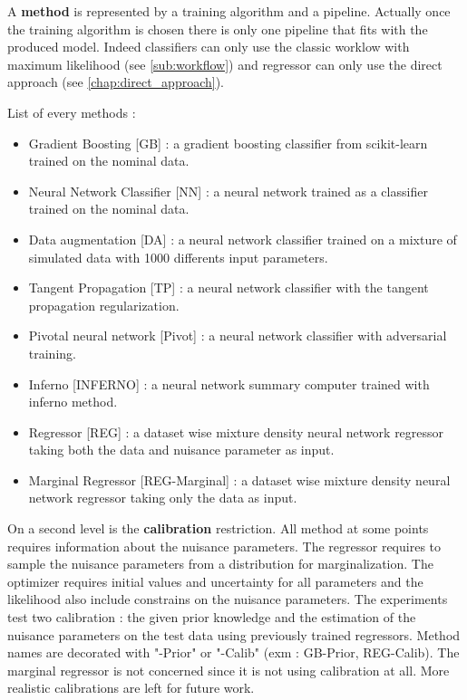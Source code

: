 A \textbf{method} is represented by a training algorithm and a pipeline.
Actually once the training algorithm is chosen there is only one pipeline that fits with the produced model.
Indeed classifiers can only use the classic worklow with maximum likelihood (see \autoref{sub:workflow}) and regressor can only use the direct approach (see \autoref{chap:direct_approach}).

List of every methods :
\begin{itemize}
	\item Gradient Boosting [GB] : a gradient boosting classifier from scikit-learn trained on the nominal data.
	\item Neural Network Classifier [NN] : a neural network trained as a classifier trained on the nominal data.
	\item Data augmentation [DA] : a neural network classifier trained on a mixture of simulated data with 1000 differents input parameters.
	\item Tangent Propagation [TP] : a neural network classifier with the tangent propagation regularization.
	\item Pivotal neural network [Pivot] : a neural network classifier with adversarial training.
	\item Inferno [INFERNO] : a neural network summary computer trained with inferno method.
	\item Regressor [REG] : a dataset wise mixture density neural network regressor taking both the data and nuisance parameter as input.
	\item Marginal Regressor [REG-Marginal] : a dataset wise mixture density neural network regressor taking only the data as input.
\end{itemize}

On a second level is the \textbf{calibration} restriction.
All method at some points requires information about the nuisance parameters.
The regressor requires to sample the nuisance parameters from a distribution for marginalization.
The optimizer requires initial values and uncertainty for all parameters and the likelihood also include constrains on the nuisance parameters.
The experiments test two calibration : the given prior knowledge and the estimation of the nuisance parameters on the test data using previously trained regressors.
Method names are decorated with "-Prior" or "-Calib" (exm : GB-Prior, REG-Calib). The marginal regressor is not concerned since it is not using calibration at all.
More realistic calibrations are left for future work.

